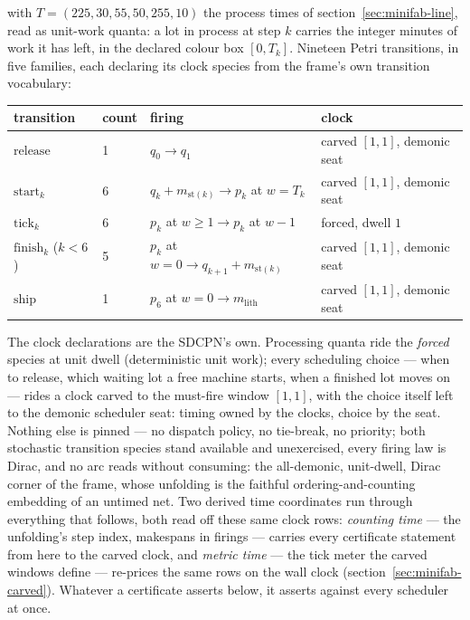 \noindent with $T = (225, 30, 55, 50, 255, 10)$ the process times of
section~\ref{sec:minifab-line}, read as unit-work quanta: a lot in
process at step $k$ carries the integer minutes of work it has left,
in the declared colour box $[0, T_k]$. Nineteen Petri transitions,
in five families, each declaring its clock species from the frame's
own transition vocabulary:

\begin{center}\small
\begin{tabular}{@{}llll@{}}
\toprule
transition & count & firing & clock\\
\midrule
$\mathrm{release}$ & 1 & $q_0 \to q_1$ & carved $[1,1]$, demonic seat\\
$\mathrm{start}_k$ & 6 & $q_k + m_{\mathrm{st}(k)} \to p_k$ at
  $w = T_k$ & carved $[1,1]$, demonic seat\\
$\mathrm{tick}_k$ & 6 & $p_k$ at $w \ge 1 \to p_k$ at $w - 1$ &
  forced, dwell $1$\\
$\mathrm{finish}_k$ ($k < 6$) & 5 & $p_k$ at $w = 0 \to q_{k+1} +
  m_{\mathrm{st}(k)}$ & carved $[1,1]$, demonic seat\\
$\mathrm{ship}$ & 1 & $p_6$ at $w = 0 \to m_{\mathrm{lith}}$ &
  carved $[1,1]$, demonic seat\\
\bottomrule
\end{tabular}
\end{center}

\noindent The clock declarations are the SDCPN's own. Processing
quanta ride the \emph{forced} species at unit dwell (deterministic
unit work); every scheduling choice --- when to release, which
waiting lot a free machine starts, when a finished lot moves on ---
rides a clock carved to the must-fire window $[1, 1]$, with the
choice itself left to the demonic scheduler seat: timing owned by
the clocks, choice by the seat. Nothing else is pinned --- no
dispatch policy, no tie-break, no priority; both stochastic
transition species stand available and unexercised, every firing
law is Dirac, and no arc reads without consuming: the all-demonic,
unit-dwell, Dirac corner of the frame, whose unfolding is the
faithful ordering-and-counting embedding of an untimed net. Two
derived time coordinates run through everything that follows, both
read off these same clock rows: \emph{counting time} --- the
unfolding's step index, makespans in firings --- carries every
certificate statement from here to the carved clock, and
\emph{metric time} --- the tick meter the carved windows define ---
re-prices the same rows on the wall clock
(section~\ref{sec:minifab-carved}). Whatever a certificate asserts
below, it asserts against every scheduler at once.

